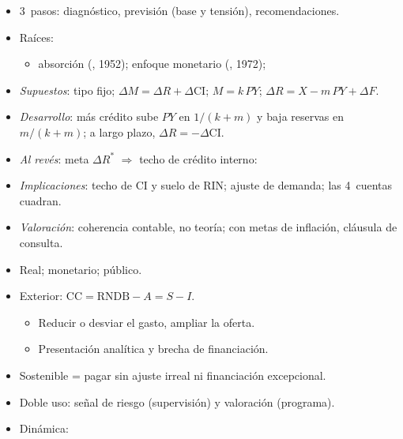 \documentclass{article}
\begin{document}
\begin{columnas}
\begin{itemize}
\item 3~pasos: diagnóstico, previsión (base y tensión), recomendaciones.
\item Raíces:
  \begin{itemize}
  \item absorción (, 1952); enfoque monetario (, 1972);
  \end{itemize}
\end{itemize}
\begin{itemize}
\item \emph{Supuestos}: tipo fijo; $\Delta M=\Delta R+\Delta\mathrm{CI}$; $M=k\,PY$; $\Delta R=X-m\,PY+\Delta F$.
\item \emph{Desarrollo}: más crédito sube $PY$ en $1/(k+m)$ y baja reservas en $m/(k+m)$; a largo plazo, $\Delta R=-\Delta\mathrm{CI}$.
\item \emph{Al revés}: meta $\Delta R^*$ $\Rightarrow$ techo de crédito interno:
\item \emph{Implicaciones}: techo de CI y suelo de RIN; ajuste de demanda; las 4~cuentas cuadran.
\item \emph{Valoración}: coherencia contable, no teoría; con metas de inflación, cláusula de consulta.
\end{itemize}
\begin{itemize}
\item Real; monetario; público.
\item Exterior: $\mathrm{CC}=\mathrm{RNDB}-A=S-I$.
  \begin{itemize}
  \item Reducir o desviar el gasto, ampliar la oferta.
  \item Presentación analítica y brecha de financiación.
  \end{itemize}
\end{itemize}
\begin{itemize}
\item Sostenible = pagar sin ajuste irreal ni financiación excepcional.
\item Doble uso: señal de riesgo (supervisión) y valoración (programa).
\item Dinámica:

\end{itemize}
\end{columnas}
\end{document}
